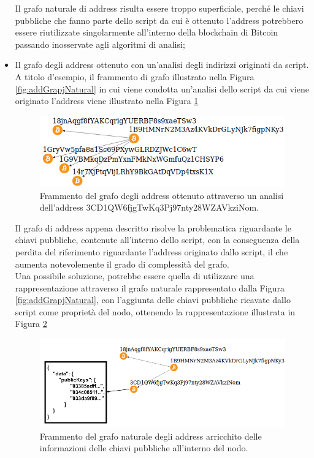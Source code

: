 \begin{itemize}
   Il grafo naturale di address risulta essere troppo superficiale, perché le chiavi pubbliche che fanno parte dello script da cui è ottenuto l'address  potrebbero essere riutilizzate singolarmente all'interno della blockchain di Bitcoin passando inosservate agli algoritmi di analisi;
   \item Il grafo degli address ottenuto con un'analisi degli indirizzi originati da script. A titolo d'esempio, il frammento di grafo illustrato nella Figura \ref{fig:addGrapjNatural} in cui viene condotta un'analisi dello script da cui viene originato l'address  viene illustrato nella Figura \ref{fig:addGraphAnalisis}
   \begin{figure}[H]
   \centering
   \includegraphics[scale=0.35]{images/exampleWithGraph/decode-address-graph-scam.png}
   \caption{Frammento del grafo degli address ottenuto attraverso un analisi dell'address 3CD1\-QW6fjg\-TwKq3Pj\-97nty28W\-ZAVkz\-iNom.\label{fig:addGraphAnalisis}}
   \end{figure}
   Il grafo di address appena descritto risolve la problematica riguardante le chiavi pubbliche, contenute all'interno dello script, con la conseguenza della perdita del riferimento riguardante l'address originato dallo script, il che aumenta notevolemente il grado di complessità del grafo.\\
   Una possibile soluzione, potrebbe essere quella di utilizzare una rappresentazione attraverso il grafo naturale rappresentato dalla Figura \ref{fig:addGrapjNatural}, con l'aggiunta delle chiavi pubbliche ricavate dallo script come proprietà del nodo, ottenendo la rappresentazione illustrata in Figura \ref{fig:addGrapjNaturalPlus}
   \begin{figure}[H]
   \centering
   \includegraphics[scale=1.4]{images/exampleWithGraph/naturalAddressGrahScamTx_correcter.png}
   \caption{Frammento del grafo naturale degli address arricchito delle informazioni delle chiavi pubbliche all'interno del nodo.\label{fig:addGrapjNaturalPlus}}
   \end{figure}
 \end{itemize}

